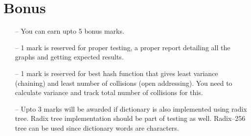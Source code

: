 \documentclass[12pt,a4paper]{article}
\begin{document}
\section{Bonus}
\begin{itemize}
\item[--] You can earn upto 5 bonus marks.
\item[--] 1 mark is reserved for proper testing, a proper report detailing all the graphs and getting expected results.
\item[--] 1 mark is reserved for best hash function that gives least variance (chaining) and least number of collisions (open addressing). You need to calculate variance and track total number of collisions for this.
\item[--] Upto 3 marks will be awarded if dictionary is also implemented using radix tree. Radix tree implementation should be part of testing as well. Radix--256 tree can be used since dictionary words are characters.
\end{itemize}
\end{document}
